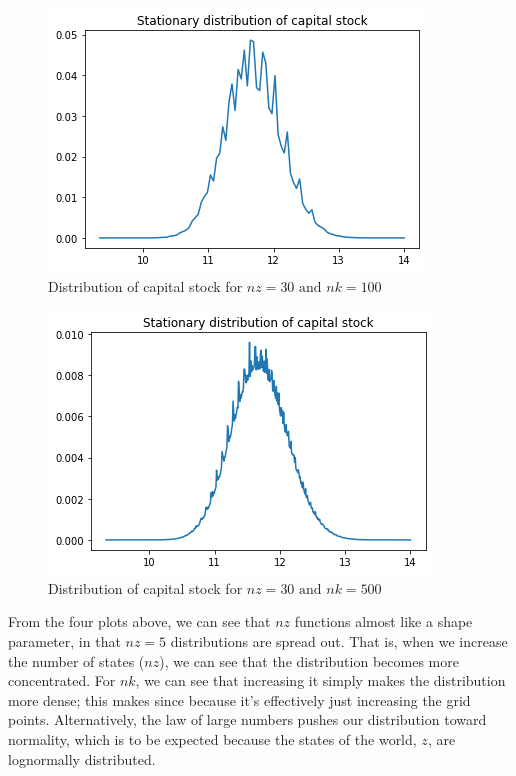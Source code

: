 \documentclass[12pt]{article}
\begin{document}
\begin{doublespace}
\begin{figure}[h]
\caption{Distribution of capital stock for $nz=30 \mbox{ and } nk=100$}
\includegraphics{capital_distribution_nz30_nk100}
\end{figure}

\begin{figure}[h]
\caption{Distribution of capital stock for $nz=30 \mbox{ and } nk=500$}
\includegraphics{capital_distribution_nz30_nk500}
\end{figure}

\clearpage

From the four plots above, we can see that $nz$ functions almost like a shape parameter, in that $nz=5$ distributions are spread out. That is, when we increase the number of states ($nz$), we can see that the distribution becomes more concentrated. For $nk$, we can see that increasing it simply makes the distribution more dense; this makes since because it's effectively just increasing the grid points. Alternatively, the law of large numbers pushes our distribution toward normality, which is to be expected because the states of the world, $z$, are lognormally distributed. \\


\end{doublespace}
\end{document}

